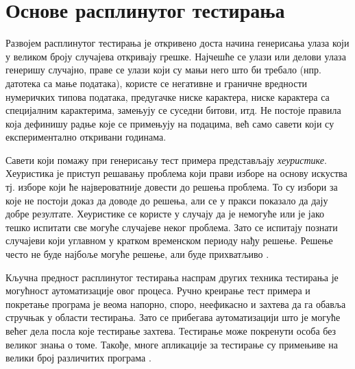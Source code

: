 \documentclass[12pt,oneside]{memoir}
\begin{document}
\section{Основе расплинутог тестирања}
\label{sec:osnoveRasplTestiranja}

Развојем расплинутог тестирања је откривено доста начина генерисања улаза који у великом броју случајева откривају грешке. Најчешће се улази или делови улаза генеришу случајно, праве се улази који су мањи него што би требало (нпр. датотека са мање података), користе се негативне и граничне вредности нумеричких типова података, предугачке ниске карактера, ниске карактера са специјалним карактерима, замењују се суседни битови, итд. Не постоје правила која дефинишу радње које се примењују на подацима, већ само савети који су експериментално откривани годинама.  

Савети који помажу при генерисању тест примера представљају \textit{хеуристике}. Хеуристика је приступ решавању проблема који прави изборе на основу искуства тј. изборе који ће највероватније довести до решења проблема. То су избори за које не постоји доказ да доводе до решења, али се у пракси показало да дају добре резултате. Хеуристике се користе у случају да је немогуће или је јако тешко испитати све могуће случајеве неког проблема. Зато се испитају познати случајеви који углавном у кратком временском периоду нађу решење. Решење често не буде најбоље могуће решење, али буде прихватљиво \cite{heuristics}.

Кључна предност расплинутог тестирања наспрам других техника тестирања је могућност аутоматизације овог процеса. Ручно креирање тест примера и покретање програма је веома напорно, споро, неефикасно и захтева да га обавља стручњак у области тестирања. Зато се прибегава аутоматизацији што је могуће већег дела посла које тестирање захтева. Тестирање може покренути особа без великог знања о томе. Такође, многе апликације за тестирање су примењиве на велики број различитих програма \cite{fuzzingBrute, fuzzing}.
\end{document}
